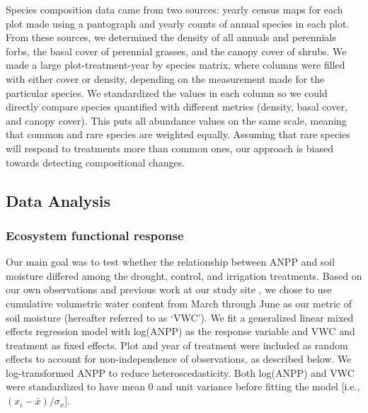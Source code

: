\documentclass[fleqn,10pt,lineno]{wlpeerj} %
\begin{document}
Species composition data came from two sources: yearly census maps for
each plot made using a pantograph \citep{Hill1920} and yearly counts of
annual species in each plot. From these sources, we determined the
density of all annuals and perennials forbs, the basal cover of
perennial grasses, and the canopy cover of shrubs. We made a large
plot-treatment-year by species matrix, where columns were filled with
either cover or density, depending on the measurement made for the
particular species. We standardized the values in each column so we
could directly compare species quantified with different metrics
(density, basal cover, and canopy cover). This puts all abundance values
on the same scale, meaning that common and rare species are weighted
equally. Assuming that rare species will respond to treatments more than
common ones, our approach is biased towards detecting compositional
changes.

\subsection{Data Analysis}\label{data-analysis}

\subsubsection{Ecosystem functional
response}\label{ecosystem-functional-response}

Our main goal was to test whether the relationship between ANPP and soil
moisture differed among the drought, control, and irrigation treatments.
Based on our own observations and previous work at our study site
\citep{Blaisdell1958, Dalgleish2011, Adler2012}, we chose to use
cumulative volumetric water content from March through June as our
metric of soil moisture (hereafter referred to as `VWC'). We fit a
generalized linear mixed effects regression model with log(ANPP) as the
response variable and VWC and treatment as fixed effects. Plot and year
of treatment were included as random effects to account for
non-independence of observations, as described below. We log-transformed
ANPP to reduce heteroscedasticity. Both log(ANPP) and VWC were
standardized to have mean 0 and unit variance before fitting the model
{[}i.e., \((x_i - \bar{x})/\sigma_x\){]}.
\end{document}
